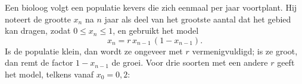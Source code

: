 %


\begin{probleem}
Een bioloog volgt een populatie kevers die zich eenmaal per jaar voortplant. Hij noteert de grootte $x_n$ na $n$ jaar als deel van het grootste aantal dat het gebied kan dragen, zodat $0 \leqslant x_n \leqslant 1$, en gebruikt het model
\[
x_n = r\,x_{n-1}\,(1 - x_{n-1}) .
\]
Is de populatie klein, dan wordt ze ongeveer met $r$ vermenigvuldigd; is ze groot, dan remt de factor $1 - x_{n-1}$ de groei. Voor drie soorten met een andere $r$ geeft het model, telkens vanaf $x_0 = 0{,}2$:


\end{probleem}
